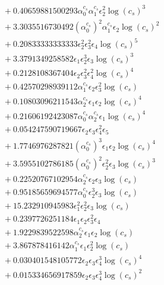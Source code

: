 \documentclass[10pt]{article}
\begin{document}
\begin{align*}
&{}  + 0.40659881500293 \alpha_{0}^{c_s} \alpha_{1}^{c_s} \epsilon_{2}^{2} \log{\left(c_{s} \right)}^{3} \\
&{}  + 3.3035516730492 \left(\alpha_{0}^{c_s}\right)^{2} \alpha_{1}^{c_s} \epsilon_{2} \log{\left(c_{s} \right)}^{2} \\
&{}  + 0.20833333333333 \epsilon_{2}^{2} \epsilon_{3}^{2} \epsilon_{4} \log{\left(c_{s} \right)}^{5} \\
&{}  + 3.3791349258582 \epsilon_{1} \epsilon_{2}^{3} \epsilon_{3} \log{\left(c_{s} \right)}^{3} \\
&{}  + 0.2128108367404 \epsilon_{2} \epsilon_{3}^{2} \epsilon_{4}^{2} \log{\left(c_{s} \right)}^{4} \\
&{}  + 0.42570298939112 \alpha_{1}^{c_s} \epsilon_{2} \epsilon_{3}^{2} \log{\left(c_{s} \right)} \\
&{}  + 0.10803096211543 \alpha_{2}^{c_s} \epsilon_{1} \epsilon_{2} \log{\left(c_{s} \right)}^{4} \\
&{}  + 0.21606192423087 \alpha_{0}^{c_s} \alpha_{2}^{c_s} \epsilon_{1} \log{\left(c_{s} \right)}^{4} \\
&{}  + 0.054247590719667 \epsilon_{2} \epsilon_{3} \epsilon_{4}^{2} \epsilon_{5} \\
&{}  + 1.7746976287821 \left(\alpha_{0}^{c_s}\right)^{3} \epsilon_{1} \epsilon_{2} \log{\left(c_{s} \right)}^{4} \\
&{}  + 3.5955102786185 \left(\alpha_{0}^{c_s}\right)^{2} \epsilon_{2}^{2} \epsilon_{3} \log{\left(c_{s} \right)}^{3} \\
&{}  + 0.22520767102954 \alpha_{2}^{c_s} \epsilon_{2} \epsilon_{3} \log{\left(c_{s} \right)} \\
&{}  + 0.95185659694577 \alpha_{0}^{c_s} \epsilon_{2}^{3} \epsilon_{3} \log{\left(c_{s} \right)} \\
&{}  + 15.232910945983 \epsilon_{1}^{2} \epsilon_{2}^{2} \epsilon_{3} \log{\left(c_{s} \right)} \\
&{}  + 0.2397726251184 \epsilon_{1} \epsilon_{2} \epsilon_{3}^{2} \epsilon_{4} \\
&{}  + 1.9229839522598 \alpha_{2}^{c_s} \epsilon_{1} \epsilon_{2} \log{\left(c_{s} \right)} \\
&{}  + 3.867878416142 \alpha_{1}^{c_s} \epsilon_{1} \epsilon_{2}^{2} \log{\left(c_{s} \right)} \\
&{}  + 0.030401548105772 \epsilon_{2} \epsilon_{3} \epsilon_{4}^{3} \log{\left(c_{s} \right)}^{4} \\
&{}  + 0.015334656917859 \epsilon_{2} \epsilon_{3} \epsilon_{4}^{3} \log{\left(c_{s} \right)}^{2} \\

\end{align*}
\end{document}
